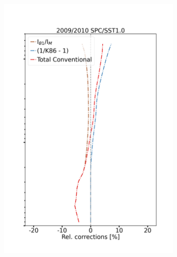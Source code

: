 \documentclass{article}
\begin{document}
\begin{figure}
\begin{subfigure}[t]{0.27\textwidth}
            \includegraphics[width=\linewidth]{png/v5_relative_corrections_unc__sm_hv_0910_Conventional_SPC1010.png}
        \end{subfigure}

    \end{figure}

    
\end{document}

